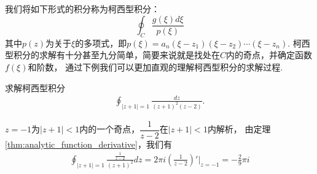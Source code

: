         我们将如下形式的积分称为柯西型积分：$$\oint_C \frac{g(\xi)d\xi}{p(\xi)}$$
        其中$p(z)$为关于$\xi$的多项式，即$p(\xi) = a_n(\xi - z_1)(\xi - z_2)\cdots(\xi - z_n)$.
        柯西型积分的求解有十分甚至九分简单，简要来说就是找处在$C$内的奇点，并确定函数$f(\xi)$和阶数，
        通过下例我们可以更加直观的理解柯西型积分的求解过程.
        \begin{example}
            求解柯西型积分
            \begin{align*}
                \oint_{|z + 1| = 1}\frac{dz}{(z + 1)^2(z - 2)}.
            \end{align*}
        \end{example}
        \begin{solution}
            $z = -1$为$|z + 1| < 1$内的一个奇点，$\dfrac{1}{z - 2}$在$|z + 1| < 1$内解析，
            由定理\ref{thm:analytic_function_derivative}，我们有
            \begin{align*}
                \oint_{|z + 1| = 1}\frac{\frac{1}{z - 2}}{(z + 1)^2}dz = 2\pi i\left( \frac{1}{z - 2} \right)'\Bigg|_{z=-1} = -\frac{2}{9}\pi i
            \end{align*}
        \end{solution}